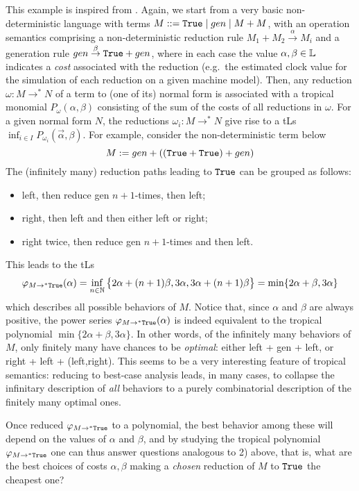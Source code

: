 This example is inspired from \cite{Manzo2013}. Again, we start from a very basic non-deterministic language with terms $M::= \true \mid  \mathsf{gen} \mid  M + M$, with an operation semantics comprising a non-deterministic reduction rule 
$M_{1}+M_{2} \stackrel{\alpha}{\to} M_{i}$ and a generation rule
$\mathsf{gen}\stackrel{\beta}{\to} \true +\mathsf{gen}$, 
where in each case the value $\alpha,\beta\in \mathbb{L}$ indicates a \emph{cost} associated with the reduction (e.g.~the estimated clock value for the simulation of each reduction on a given machine model). 
Then, any reduction $\omega: M \to^{*} N$ of a term to (one of its) normal form is  associated with a tropical monomial $P_{\omega}( \alpha,\beta)$ consisting of the sum of the costs of all reductions in $\omega$. For a given normal form $N$, the reductions $\omega_{i}: M \to^{*}N$ give rise to a tLs $\inf_{i\in I}P_{\omega_{i}}(\vec \alpha,\beta)$. 
For example, consider the non-deterministic term below
$$
M :=\mathsf{gen}+  ((\true + \true) + \mathsf{gen})
$$
The (infinitely many) reduction paths leading to $\mathtt{True}$ can be grouped as follows:
\begin{itemize}
\item left, then reduce gen $n+1$-times, then left;
\item right, then left and then either left or right;
\item right twice, then reduce gen $n+1$-times and then left.
\end{itemize}
This leads to the tLs 
$$\varphi_{M\to^{*}\mathtt{True}}(\alpha)=\inf_{n\in \mathbb N}\big\{2\alpha+(n+1)\beta, 3\alpha, 3\alpha+(n+1)\beta\big \}= \min\{ 2\alpha+\beta, 3\alpha\}$$which describes all possible behaviors of $M$. Notice that, since $\alpha$ and $\beta$ are always positive, the power series $\varphi_{M\to^{*}\mathtt{True}}(\alpha)$ is indeed equivalent to the tropical polynomial $\min\{ 2\alpha+\beta, 3\alpha\}$. In other words, of the infinitely many behaviors of $M$, only finitely many have chances to be \emph{optimal}: either left + gen + left, or right + left + (left,right). This seems to be a very interesting feature of tropical semantics: reducing to best-case analysis leads, in many cases, to collapse the infinitary description of \emph{all} behaviors to a purely combinatorial description of the finitely many optimal ones. 

Once reduced $\varphi_{M\to^{*}\mathtt{True}}$ to a polynomial, the best behavior among these will depend on the values of $\alpha$ and $\beta$, and by studying the tropical polynomial $\varphi_{M\to^{*}\mathtt{True}}$ one can thus answer questions analogous to 2) above, that is, what are the best choices of costs $\alpha,\beta$ making a \emph{chosen} reduction of $M$ to $\mathtt{True}$ the cheapest one?



















